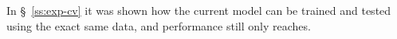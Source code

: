 In \S~\ref{ss:exp-cv} it was shown how the current model
can be trained and tested using the exact same data,
and performance still only reaches.



%

